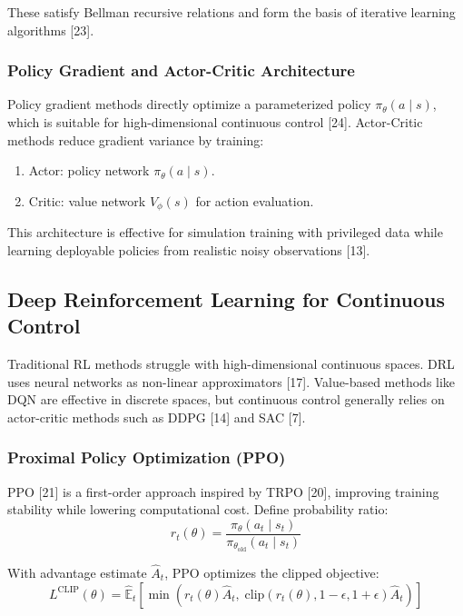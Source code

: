 These satisfy Bellman recursive relations and form the basis of iterative learning algorithms [23].

\subsubsection*{Policy Gradient and Actor-Critic Architecture}

Policy gradient methods directly optimize a parameterized policy $\pi_\theta(a\mid s)$, which is suitable for high-dimensional continuous control [24]. Actor-Critic methods reduce gradient variance by training:
\begin{enumerate}
    \item Actor: policy network $\pi_\theta(a\mid s)$.
    \item Critic: value network $V_\phi(s)$ for action evaluation.
\end{enumerate}

This architecture is effective for simulation training with privileged data while learning deployable policies from realistic noisy observations [13].

\subsection{Deep Reinforcement Learning for Continuous Control}

Traditional RL methods struggle with high-dimensional continuous spaces. DRL uses neural networks as non-linear approximators [17]. Value-based methods like DQN are effective in discrete spaces, but continuous control generally relies on actor-critic methods such as DDPG [14] and SAC [7].

\subsubsection*{Proximal Policy Optimization (PPO)}

PPO [21] is a first-order approach inspired by TRPO [20], improving training stability while lowering computational cost. Define probability ratio:
\begin{equation}
r_t(\theta) = \frac{\pi_\theta(a_t\mid s_t)}{\pi_{\theta_{\text{old}}}(a_t\mid s_t)}
\end{equation}

With advantage estimate $\hat{A}_t$, PPO optimizes the clipped objective:
\begin{equation}
L^{\text{CLIP}}(\theta) = \hat{\mathbb{E}}_t\left[\min\left(r_t(\theta)\hat{A}_t,\;\text{clip}(r_t(\theta), 1-\epsilon, 1+\epsilon)\hat{A}_t\right)\right]
\end{equation}

